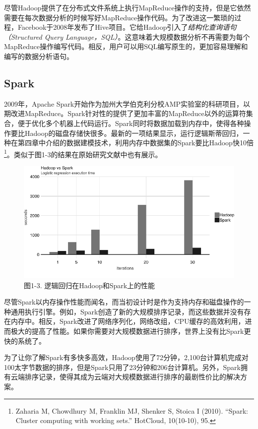 \documentclass[
]{article}
\begin{document}
尽管Hadoop提供了在分布式文件系统上执行MapReduce操作的支持，但是它依然需要在每次数据分析的时候写好MapReduce操作代码。为了改进这一繁琐的过程，Facebook于2008年发布了Hive项目。它给Hadoop引入了\emph{结构化查询语句（Structured
Query
Language，SQL）}。这意味着大规模数据分析不再需要为每个MapReduce操作编写代码。相反，用户可以用SQL编写原生的，更加容易理解和编写的数据分析语句。

\hypertarget{spark}{%
\subsection{Spark}\label{spark}}

2009年，Apache
Spark开始作为加州大学伯克利分校AMP实验室的科研项目，以期改进MapReduce。Spark针对性的提供了更加丰富的MapReduce以外的运算符集合，便于优化多个机器上代码运行。Spark同时将数据加载到内存中，使得各种操作要比Hadoop的磁盘存储快很多。最新的一项结果显示，运行逻辑斯蒂回归，一种在第四章中介绍的数据建模技术，利用内存中数据集的Spark要比Hadoop快10倍\footnote{Zaharia
  M, Chowdhury M, Franklin MJ, Shenker S, Stoica I (2010). ``Spark:
  Cluster computing with working sets.'' HotCloud, 10(10-10), 95.}。类似于图1-3的结果在原始研究文献中也有展示。

\begin{figure}
\centering
\includegraphics{figures/1_3.png}
\caption{图1-3. 逻辑回归在Hadoop和Spark上的性能}
\end{figure}

尽管Spark以内存操作性能而闻名，而当初设计时是作为支持内存和磁盘操作的一种通用执行引擎。例如，Spark创造了新的大规模排序记录，而这些数据并没有存在内存中。相反，Spark改进了网络序列化，网络改组，CPU缓存的高效利用，进而极大的提高了性能。如果你需要对大规模数据进行排序，世界上没有比Spark更快的系统了。

为了让你了解Spark有多快多高效，Hadoop使用了72分钟，2,100台计算机完成对100太字节数据的排序，但是Spark只用了23分钟和206台计算机。另外，Spark拥有云端排序记录，使得其成为云端对大规模数据进行排序的最剧性价比的解决方案。
\end{document}
